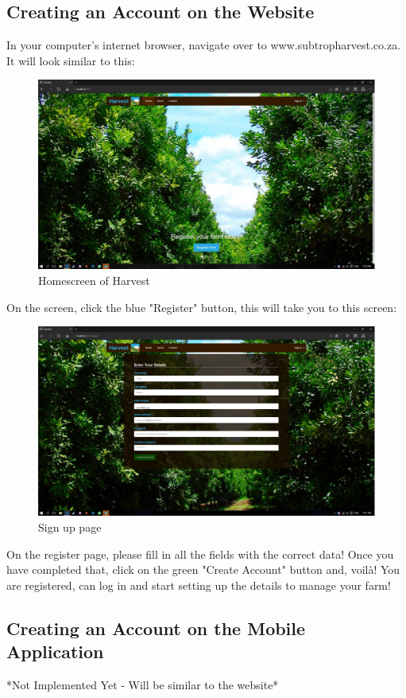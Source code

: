 \documentclass[11pt,fleqn]{book} %
\begin{document}
		\subsection{Creating an Account on the Website}
			In your computer's internet browser, navigate over to www.subtropharvest.co.za. It will look similar to this:
			\begin{figure}[H]
				\includegraphics[scale=0.25]{Pictures/homescreen.jpg}\centering
				\caption{Homescreen of Harvest}
			\end{figure}
			On the screen, click the blue "Register" button, this will take you to this screen:
			\begin{figure}[H]
				\includegraphics[scale=0.25]{Pictures/signup.jpg}\centering
				\caption{Sign up page}
			\end{figure}
			On the register page, please fill in all the fields with the correct data! Once you have completed that, click on the green "Create Account" button and, voilà! You are registered, can log in and start setting up the details to manage your farm!
		\subsection{Creating an Account on the Mobile Application}
			*Not Implemented Yet - Will be similar to the website*
\end{document}
